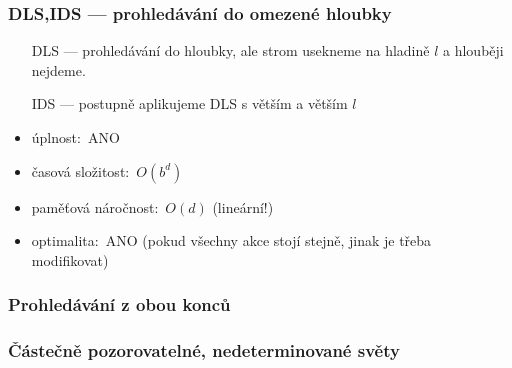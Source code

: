 \documentclass[red,professionalfont]{beamer}
\theoremstyle{definition}
\newcommand{\0}{\mbox{${\bf 0}$}}
\begin{document}
\begin{frame}\frametitle{DLS,IDS --- prohledávání do omezené hloubky}
\begin{itemize}
\item[DLS] --- prohledávání do hloubky, ale strom usekneme na hladině $l$ a hlouběji
nejdeme.\pause
\item[IDS] --- postupně aplikujeme DLS s větším a větším $l$\pause
\end{itemize}
\begin{itemize}
  \item úplnost:\pause\ ANO\pause
  \item časová složitost:\pause\ $O(b^d)$\pause
  \item paměťová náročnost:\pause\ $O(d)$ (\alert{lineární}!)\pause
  \item optimalita:\pause\ ANO (pokud všechny akce stojí stejně, jinak je třeba modifikovat)
 \end{itemize}\pause
\end{frame}


\begin{frame}\frametitle{Prohledávání z obou konců}
\end{frame}

\begin{frame}\frametitle{Částečně pozorovatelné, nedeterminované světy}
\end{frame}
\end{document}
